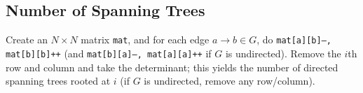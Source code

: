 	\subsection{Number of Spanning Trees}
		Create an $N\times N$ matrix \texttt{mat}, and for each edge $a \rightarrow b \in G$, do
		\texttt{mat[a][b]--, mat[b][b]++} (and \texttt{mat[b][a]--, mat[a][a]++} if $G$ is undirected).
		Remove the $i$th row and column and take the determinant; this yields the number of directed spanning trees rooted at $i$
		(if $G$ is undirected, remove any row/column).
